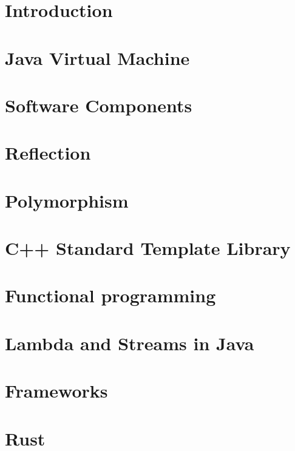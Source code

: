 \documentclass{report}
\begin{document}


\chapter{Introduction}


\chapter{Java Virtual Machine}


\chapter{Software Components}


\chapter{Reflection}


\chapter{Polymorphism}


\chapter{C++ Standard Template Library}


\chapter{Functional programming}


\chapter{Lambda and Streams in Java}


\chapter{Frameworks}


\chapter{Rust}

\end{document}
